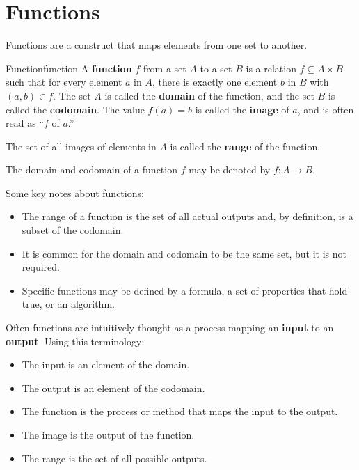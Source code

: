 \section{Functions}

Functions are a construct that maps elements from one set to another.

\begin{definition}{Function}{function}
  A \textbf{function} \( f \) from a set \( A \) to a set \( B \) is a relation
  \( f \subseteq A \times B \) such that for every element \( a \) in \( A \),
  there is exactly one element \( b \) in \( B \) with \( (a, b) \in f \).
  The set \( A \) is called the \textbf{domain} of the function, and the set
  \( B \) is called the \textbf{codomain}. The value \( f(a) = b \) is called the
  \textbf{image} of \( a \), and is often read as “\( f \) of \( a \).”

  \medskip

  The set of all images of elements in \( A \) is called the \textbf{range} of
  the function.

  \medskip

  The domain and codomain of a function \( f \) may be denoted by \( f: A \to B \).
\end{definition}

Some key notes about functions:
\begin{itemize}
  \item The range of a function is the set of all actual outputs and, by
    definition, is a subset of the codomain.
  \item It is common for the domain and codomain to be the same set, but it is not
    required.
  \item Specific functions may be defined by a formula, a set of properties that hold true,
    or an algorithm.
\end{itemize}

Often functions are intuitively thought as a process mapping an \textbf{input} to
an \textbf{output}. Using this terminology:
\begin{itemize}
  \item The input is an element of the domain.
  \item The output is an element of the codomain.
  \item The function is the process or method that maps the input to the output.
  \item The image is the output of the function.
  \item The range is the set of all possible outputs.
\end{itemize}

